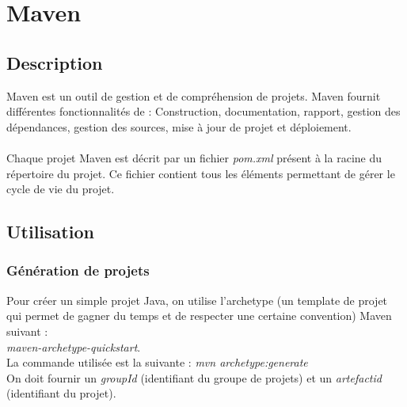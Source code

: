 \documentclass{article}
\begin{document}
\section{Maven}
\subsection{Description}
Maven est un outil de gestion et de compréhension de projets. Maven fournit différentes fonctionnalités de :
Construction, documentation, rapport, gestion des dépendances, gestion des sources, mise à jour de projet et déploiement. \\\\
Chaque projet Maven est décrit par un fichier \emph{pom.xml} présent à la racine du répertoire du projet. Ce fichier
contient tous les éléments permettant de gérer le cycle de vie du projet.
\subsection{Utilisation}
\subsubsection{Génération de projets}
Pour créer un simple projet Java, on utilise l'archetype (un template de projet qui permet de gagner du temps et de respecter une certaine convention) Maven suivant : \\
\textit{maven-archetype-quickstart}. \\
La commande utilisée est la suivante : \textit{mvn archetype:generate} \\
On doit fournir un \textit{groupId} (identifiant du groupe de projets) et un \textit{artefactid} (identifiant du projet).\\
\end{document}
